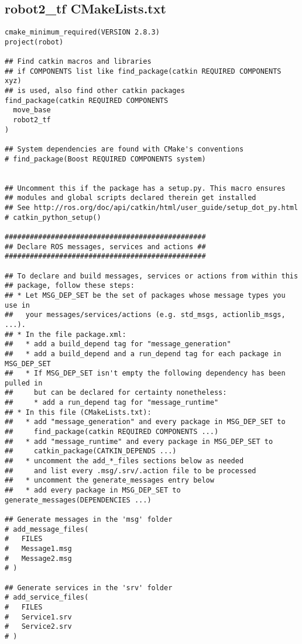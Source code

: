 \subsection{robot2\_tf CMakeLists.txt}
\begin{lstlisting}
cmake_minimum_required(VERSION 2.8.3)
project(robot)

## Find catkin macros and libraries
## if COMPONENTS list like find_package(catkin REQUIRED COMPONENTS xyz)
## is used, also find other catkin packages
find_package(catkin REQUIRED COMPONENTS
  move_base
  robot2_tf
)

## System dependencies are found with CMake's conventions
# find_package(Boost REQUIRED COMPONENTS system)


## Uncomment this if the package has a setup.py. This macro ensures
## modules and global scripts declared therein get installed
## See http://ros.org/doc/api/catkin/html/user_guide/setup_dot_py.html
# catkin_python_setup()

################################################
## Declare ROS messages, services and actions ##
################################################

## To declare and build messages, services or actions from within this
## package, follow these steps:
## * Let MSG_DEP_SET be the set of packages whose message types you use in
##   your messages/services/actions (e.g. std_msgs, actionlib_msgs, ...).
## * In the file package.xml:
##   * add a build_depend tag for "message_generation"
##   * add a build_depend and a run_depend tag for each package in MSG_DEP_SET
##   * If MSG_DEP_SET isn't empty the following dependency has been pulled in
##     but can be declared for certainty nonetheless:
##     * add a run_depend tag for "message_runtime"
## * In this file (CMakeLists.txt):
##   * add "message_generation" and every package in MSG_DEP_SET to
##     find_package(catkin REQUIRED COMPONENTS ...)
##   * add "message_runtime" and every package in MSG_DEP_SET to
##     catkin_package(CATKIN_DEPENDS ...)
##   * uncomment the add_*_files sections below as needed
##     and list every .msg/.srv/.action file to be processed
##   * uncomment the generate_messages entry below
##   * add every package in MSG_DEP_SET to generate_messages(DEPENDENCIES ...)

## Generate messages in the 'msg' folder
# add_message_files(
#   FILES
#   Message1.msg
#   Message2.msg
# )

## Generate services in the 'srv' folder
# add_service_files(
#   FILES
#   Service1.srv
#   Service2.srv
# )


\end{lstlisting}
